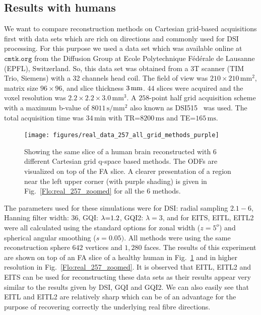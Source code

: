 \documentclass{bioinfo}
\begin{document}
\subsection{Results with humans}

We want to compare reconstruction methods on Cartesian grid-based
acquisitions first with data sets which are rich on directions and
commonly used for DSI processing. For this purpose we used a data
set which was available online at $\texttt{cmtk.org}$ from the Diffusion
Group at Ecole Polytechnique Fédérale de Lausanne (EPFL), Switzerland.
So, this data set was obtained from a 3T scanner (TIM Trio, Siemens)
with a 32 channels head coil. The field of view was $210\times210\,\textrm{mm}^{2}$,
matrix size $96\times96$, and slice thickness $3\textrm{\,\textrm{mm}}$.
$44$ slices were acquired and the voxel resolution was $2.2\times2.2\times3.0\,\textrm{mm}^{3}$.
A $258$-point half grid acquisition scheme with a maximum b-value
of $8011\,\textrm{s}/\textrm{mm}^{2}$ also known as DSI515~\cite{Wedeen2008}
was used. The total acquisition time was $34\,\textrm{min}$ with
TR=$8200\,\textrm{ms}$ and TE=$165\,\textrm{ms}$.

%
\begin{figure}
[th!]

\begin{centering}
\texttt{[image: figures/real\_data\_257\_all\_grid\_methods\_purple]}
\par\end{centering}

\caption{Showing the same slice of a human brain reconstructed with 6 different
Cartesian grid q-space based methods. The ODFs are visualized on top
of the FA slice. A clearer presentation of a region near the left
upper corner (with purple shading) is given in Fig.~\ref{Flo:real_257_zoomed}
for all the $6$ methods.}


\centering{}\label{Flo:real_257}
\end{figure}


The parameters used for these simulations were for DSI: radial sampling
$2.1-6$, Hanning filter width: $36$, GQI: $\text{\ensuremath{\lambda}=1.2}$,
GQI2: $\lambda=3$, and for EITS, EITL, EITL2 were all calculated
using the standard options for zonal width ($z=5^{o}$) and spherical
angular smoothing ($s=0.05)$. All methods were using the same reconstruction
sphere $642$ vertices and $1,280$ faces. The results of this experiment
are shown on top of an FA slice of a healthy human in Fig.~\ref{Flo:real_257}
and in higher resolution in Fig.~\ref{Flo:real_257_zoomed}. It is
observed that EITL, EITL2 and EITS can be used for reconstructing
these data sets as their results appear very similar to the results
given by DSI, GQI and GQI2. We can also easily see that EITL and EITL2
are relatively sharp which can be of an advantage for the purpose
of recovering correctly the underlying real fibre directions.
\end{document}
